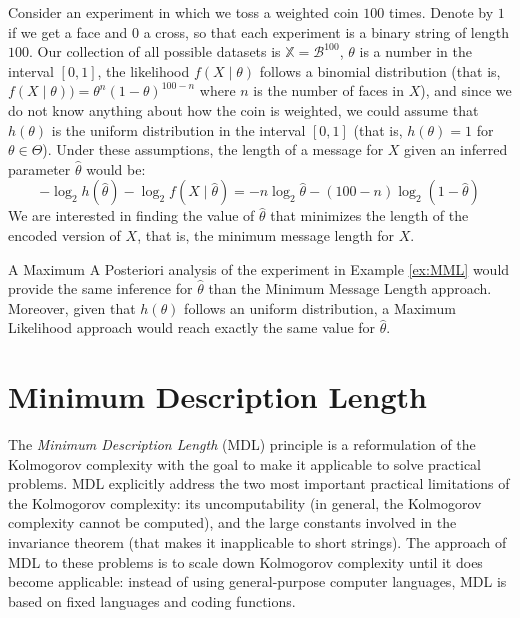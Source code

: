 {\begin{example}
    \label{ex:MML}
    Consider an experiment in which we toss a weighted coin $100$ times. Denote by $1$ if we get a face and $0$ a cross, so that each experiment is a binary string of length $100$. Our collection of all possible datasets is $\mathbb{X} = \mathcal{B}^{100}$, $\theta$ is a number in the interval $[0, 1]$, the likelihood $f (X \mid \theta)$ follows a binomial distribution (that is, $f (X \mid \theta) ) = \theta^n (1-\theta)^{100-n}$ where $n$ is the number of faces in $X$), and since we do not know anything about how the coin is weighted, we could assume that $h(\theta)$ is the uniform distribution in the interval $[0, 1]$ (that is, $h(\theta) = 1$ for $\theta \in \Theta$). Under these assumptions, the length of a message for $X$ given an inferred parameter $\hat\theta$ would be:
    \[
        - \log_2 h \left( \hat\theta \right) - \log_2 f \left( X \mid \hat\theta \right) = - n \log_2 \hat\theta - (100-n) \log_2 (1 - \hat\theta)
    \]
    We are interested in finding the value of $\hat\theta$ that minimizes the length of the encoded version of $X$, that is, the minimum message length for $X$.
\end{example}

A Maximum A Posteriori analysis of the experiment in Example \ref{ex:MML} would provide the same inference for $\hat\theta$ than the Minimum Message Length approach. Moreover, given that $h(\theta)$ follows an uniform distribution, a Maximum Likelihood approach would reach exactly the same value for $\hat\theta$.

%
%
\section{Minimum Description Length}
\label{sec:MDL}

The \emph{Minimum Description Length} (MDL) principle is a reformulation
of the Kolmogorov complexity with the goal to make it applicable to
solve practical problems. MDL explicitly address the two most important
practical limitations of the Kolmogorov complexity: its uncomputability
(in general, the Kolmogorov complexity cannot be computed), and the
large constants involved in the invariance theorem (that makes it
inapplicable to short strings). The approach of MDL to these problems
is to scale down Kolmogorov complexity until it does become applicable:
instead of using general-purpose computer languages, MDL is based
on fixed languages and coding functions.

}
